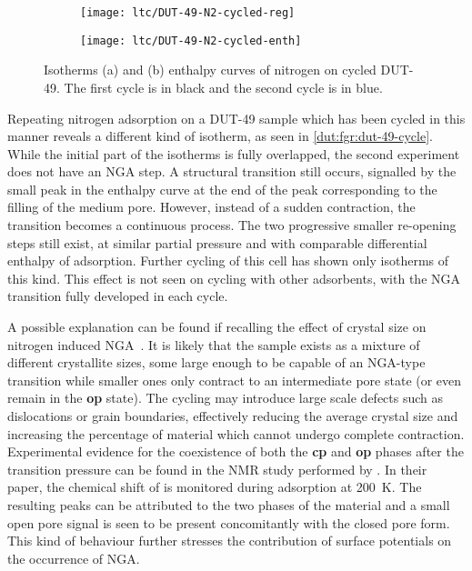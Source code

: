\begin{figure}[htb]
    \centering
    \begin{subfigure}[c]{0.5\linewidth}
        \texttt{[image: ltc/DUT-49-N2-cycled-reg]}%
        \caption{}\label{dut:fgr:dut-49-cycle-reg}
    \end{subfigure}%
    \begin{subfigure}[h]{0.5\linewidth}
        \centering
        \texttt{[image: ltc/DUT-49-N2-cycled-enth]}%
        \caption{}\label{dut:fgr:dut-49-cycle-enth}
    \end{subfigure}%
    \caption{Isotherms (a) and (b) enthalpy curves of nitrogen on
    cycled DUT-49. The first cycle is in black and the second 
    cycle is in blue.}%
    \label{dut:fgr:dut-49-cycle}
\end{figure}

Repeating nitrogen adsorption on a DUT-49 sample which has been
cycled in this manner reveals a different kind of isotherm, 
as seen in \autoref{dut:fgr:dut-49-cycle}. While the initial 
part of the isotherms is fully overlapped,
the second experiment does not have an NGA step. 
A structural transition still occurs, 
signalled by the small peak in the enthalpy curve at the end of the 
peak corresponding to the filling of the medium pore. However, instead
of a sudden contraction, the transition becomes a continuous 
process. The two progressive smaller re-opening steps still exist,
at similar partial pressure and with comparable differential enthalpy
of adsorption. Further cycling of this cell has shown only isotherms
of this kind. This effect is not seen on cycling with other 
adsorbents, with the NGA transition fully developed in each cycle. 

A possible explanation can be found if recalling the effect 
of crystal size on nitrogen induced 
NGA~\cite{krauseEffectCrystalliteSize2018}. It is likely 
that the sample exists as a mixture of different crystallite
sizes, some large enough to be capable of an NGA-type transition 
while smaller ones only contract to an intermediate pore state
(or even remain in the \textbf{op} state).
The cycling may introduce large scale defects such as dislocations
or grain boundaries, effectively reducing the average crystal size
and increasing the percentage of material which cannot undergo 
complete contraction. 
Experimental evidence for the coexistence of both the \textbf{cp} and 
\textbf{op} phases after the transition pressure can be found in the 
 NMR study performed 
by \citet{schaberSituMonitoringUnique2017}. In their paper,
the chemical shift of  is monitored during
adsorption at \SI{200}{\kelvin}. The resulting peaks can be attributed
to the two phases of the material and a small
open pore signal is seen to be present concomitantly with the 
closed pore form.
This kind of behaviour further stresses the 
contribution of surface potentials on the occurrence of NGA.
